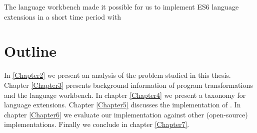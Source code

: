 The language workbench made it possible for us to implement ES6 language extensions in a short time period with 

\section{Outline}
In \ref{Chapter2} we present an analysis of the problem studied in this thesis. Chapter \ref{Chapter3} presents background information of program transformations and the language workbench. In chapter \ref{Chapter4} we present a taxonomy for language extensions.  Chapter \ref{Chapter5} discusses the implementation of \projectname. In chapter \ref{Chapter6} we evaluate our implementation against other (open-source) implementations. Finally we conclude in chapter \ref{Chapter7}.